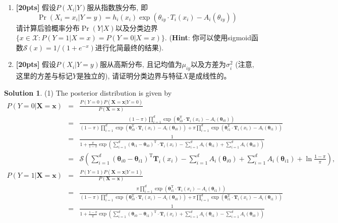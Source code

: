 \documentclass[a4paper,UTF8]{article}
\numberwithin{equation}{section}
\theoremstyle{definition}
\newtheorem*{solution}{Solution}
\begin{document}
\begin{enumerate}[(1)]
\item \textbf{[20pts]} 假设$P(X_i | Y)$服从指数族分布, 即
\[
\Pr(X_i = x_i | Y = y) = h_i(x_i) \exp (\theta_{iy} \cdot T_i(x_i) - A_{i}(\theta_{iy}))
\]
请计算后验概率分布$\Pr(Y | X)$以及分类边界$\{x \in \mathcal{X}: P(Y=1 | X = x) = P(Y=0 | X =x)\}$. (\textbf{Hint}: 你可以使用sigmoid函数$\mathcal{S}(x)=1/(1+e^{-x})$进行化简最终的结果).

\item \textbf{[20pts]} 假设$P(X_i | Y=y)$服从高斯分布, 且记均值为$\mu_{iy}$以及方差为$\sigma_{i}^2$ (注意, 这里的方差与标记$Y$是独立的), 请证明分类边界与特征$X$是成线性的。 
\end{enumerate}
\begin{solution}
\item[(1)] The posterior distribution is given by
\begin{eqnarray}
P(Y=0|\bm{X}=\bm{x})&=&\frac{P(Y=0)P(\bm{X}=\bm{x}|Y=0)}{P(\bm{X}=\bm{x})}\nonumber\\
&=&\frac{(1-\pi)\prod_{i=1}^d\exp(\bm\theta_{i0}^\mathrm{T}\cdot\bm{T}_i(x_i)-A_i(\bm{\theta}_{i0}))}{(1-\pi)\prod_{i=1}^d\exp(\bm\theta_{i0}^\mathrm{T}\cdot\bm{T}_i(x_i)-A_i(\bm{\theta}_{i0}))+\pi\prod_{i=1}^d\exp(\bm\theta_{i1}^\mathrm{T}\cdot\bm{T}_i(x_i)-A_i(\bm{\theta}_{i1}))}\nonumber\\
&=&\frac{1}{1+\frac{\pi}{1-\pi}\exp(\sum_{i=1}^d(\bm\theta_{i1}-\bm\theta_{i0})^\mathrm{T}\cdot\bm{T}_i(x_i)-\sum_{i=1}^dA_i(\bm{\theta}_{i1})+\sum_{i=1}^dA_i(\bm{\theta}_{i0}))}\nonumber\\
&=&\mathcal{S}(\sum_{i=1}^d(\bm\theta_{i0}-\bm\theta_{i1})^\mathrm{T}\bm{T}_i(x_i)-\sum_{i=1}^dA_i(\bm{\theta}_{i0})+\sum_{i=1}^dA_i(\bm{\theta}_{i1})+\ln\frac{1-\pi}{\pi}),
\end{eqnarray}
\begin{eqnarray}
P(Y=1|\bm{X}=\bm{x})&=&\frac{P(Y=1)P(\bm{X}=\bm{x}|Y=1)}{P(\bm{X}=\bm{x})}\nonumber\\
&=&\frac{\pi\prod_{i=1}^d\exp(\bm\theta_{i1}^\mathrm{T}\cdot\bm{T}_i(x_i)-A_i(\bm{\theta}_{i1}))}{(1-\pi)\prod_{i=1}^d\exp(\bm\theta_{i0}^\mathrm{T}\cdot\bm{T}_i(x_i)-A_i(\bm{\theta}_{i0}))+\pi\prod_{i=1}^d\exp(\bm\theta_{i1}^\mathrm{T}\cdot\bm{T}_i(x_i)-A_i(\bm{\theta}_{i1}))}\nonumber\\
&=&\frac{1}{1+\frac{1-\pi}{\pi}\exp(\sum_{i=1}^d(\bm\theta_{i0}-\bm\theta_{i1})^\mathrm{T}\cdot\bm{T}_i(x_i)+\sum_{i=1}^dA_i(\bm{\theta}_{i1})-\sum_{i=1}^dA_i(\bm{\theta}_{i0}))}\nonumber\\

\end{eqnarray}
\end{solution}
\end{document}
